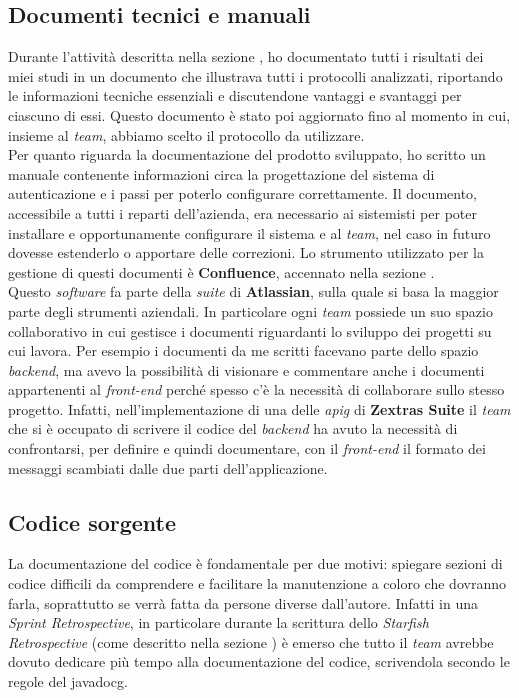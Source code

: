 \subsection{Documenti tecnici e manuali}
Durante l'attività descritta nella sezione , ho documentato tutti i risultati dei miei studi in un documento che illustrava tutti i protocolli analizzati, riportando le informazioni tecniche essenziali e discutendone vantaggi e svantaggi per ciascuno di essi. Questo documento è stato poi aggiornato fino al momento in cui, insieme al \textit{team}, abbiamo scelto il protocollo da utilizzare. \\
Per quanto riguarda la documentazione del prodotto sviluppato, ho scritto un manuale contenente informazioni circa la progettazione del sistema di autenticazione e i passi per poterlo configurare correttamente. Il documento, accessibile a tutti i reparti dell'azienda, era necessario ai sistemisti per poter installare e opportunamente configurare il sistema e al \textit{team}, nel caso in futuro dovesse estenderlo o apportare delle correzioni.
Lo strumento utilizzato per la gestione di questi documenti è \textbf{Confluence}, accennato nella sezione . \\
Questo \textit{software} fa parte della \textit{suite} di \textbf{Atlassian}, sulla quale si basa la maggior parte degli strumenti aziendali. In particolare ogni \textit{team} possiede un suo spazio collaborativo in cui gestisce i documenti riguardanti lo sviluppo dei progetti su cui lavora. Per esempio i documenti da me scritti facevano parte dello spazio \textit{backend}, ma avevo la possibilità di visionare e commentare anche i documenti appartenenti al \textit{front-end} perché spesso c'è la necessità di collaborare sullo stesso progetto. Infatti, nell'implementazione di una delle \textit{\gls{apig}} di \textbf{Zextras Suite} il \textit{team} che si è occupato di scrivere il codice del \textit{backend} ha avuto la necessità di confrontarsi, per definire e quindi documentare, con il \textit{front-end} il formato dei messaggi scambiati dalle due parti dell'applicazione.

\subsection{Codice sorgente}
La documentazione del codice è fondamentale per due motivi: spiegare sezioni di codice difficili da comprendere e facilitare la manutenzione a coloro che dovranno farla, soprattutto se verrà fatta da persone diverse dall'autore. Infatti in una \textit{Sprint Retrospective}, in particolare durante la scrittura dello \textit{Starfish Retrospective} (come descritto nella sezione ) è emerso che tutto il \textit{team} avrebbe dovuto dedicare più tempo alla documentazione del codice, scrivendola secondo le regole del \gls{javadocg}.


